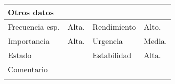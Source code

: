 \documentclass{article}
\begin{document}
\begin{table}[h]
\begin{tabular}{|l|l|l|l|l|l|}
\hline
\multicolumn{6}{|p{10cm}|}{Otros datos}\\
\hline
\multicolumn{1}{|p{2cm}|}{Frecuencia esp.} & \multicolumn{2}{p{3cm}}{Alta.} & \multicolumn{1}{|p{2cm}|}{Rendimiento} & \multicolumn{2}{p{3cm}|}{Alto.}\\
\hline
\multicolumn{1}{|p{2cm}|}{Importancia} & \multicolumn{2}{p{3cm}}{Alta.} & \multicolumn{1}{|p{2cm}|}{Urgencia} & \multicolumn{2}{p{3cm}|}{Media.}\\
\hline
\multicolumn{1}{|p{2cm}|}{Estado} & \multicolumn{2}{p{3cm}}{} & \multicolumn{1}{|p{2cm}|}{Estabilidad} & \multicolumn{2}{p{3cm}|}{Alta.}\\
\hline
\multicolumn{6}{|p{10cm}|}{Comentario}\\
\hline
\multicolumn{6}{|p{10cm}|}{}\\
\hline
\end{tabular}
\end{table}
\end{document}
